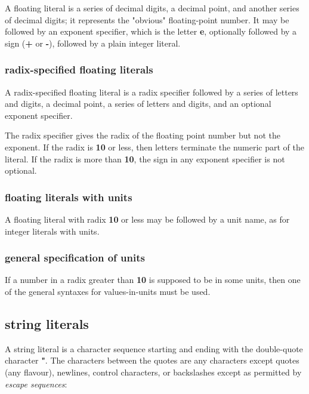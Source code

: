 \documentclass{report}
\begin{document}
A floating literal is a series of decimal digits, a decimal point, and another
series of decimal digits; it represents the "obvious" floating-point number.
It may be followed by an exponent specifier, which is the letter {\bf e},
optionally followed by a sign ({\bf +} or {\bf -}), followed by a plain integer
literal.\subsubsection{radix-specified floating literals}


A radix-specified floating literal is a radix specifier followed by a series
of letters and digits, a decimal point, a series of letters and digits, and an
optional exponent specifier.

The radix specifier gives the radix of the floating point number but not the
exponent. If the radix is {\bf 10} or less, then letters terminate the numeric
part of the literal. If the radix is more than {\bf 10}, the sign in any exponent
specifier is not optional.\subsubsection{floating literals with units}


A floating literal with radix {\bf 10} or less may be followed by a unit name, as
for integer literals with units.\subsubsection{general specification of units}


If a number in a radix greater than {\bf 10} is supposed to be in some units,
then one of the general syntaxes for values-in-units must be used.\subsection{string literals}


A string literal is a character sequence starting and ending with the
double-quote character {\bf "}. The characters between the quotes are any
characters except quotes (any flavour), newlines, control characters, or
backslashes except as permitted by {\em escape sequences}:
\end{document}
